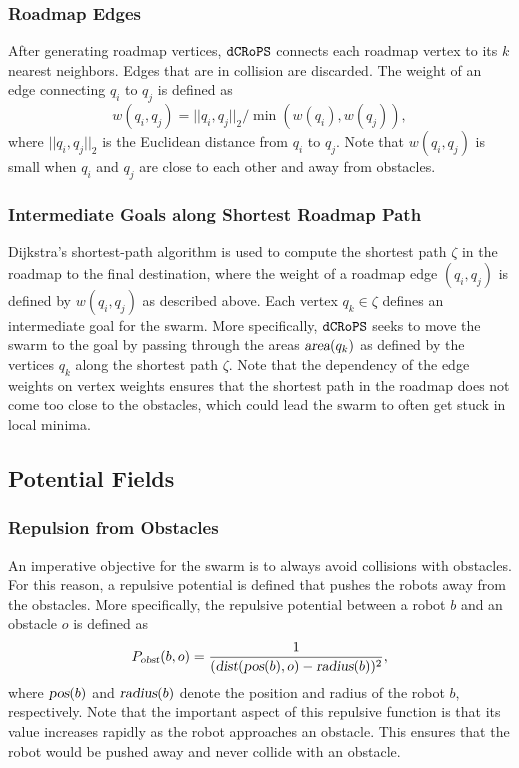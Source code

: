 \documentclass[letterpaper, 10pt, conference]{ieeeconf}
\newcommand{\Acronym}[1]{\ensuremath{{\small{\texttt{#1}}}}}
\newcommand{\Var}[1]{\ensuremath{{\small{\textsl{#1}}}}}
\newcommand{\Name}{\Acronym{dCRoPS}}
\begin{document}
\subsubsection{Roadmap Edges}
After generating roadmap vertices, $\Name$ connects each
roadmap vertex to its $k$ nearest neighbors. Edges that are in
collision are discarded. The weight of an edge connecting $q_i$ to
$q_j$ is defined as
$$
w(q_i, q_j) = ||q_i, q_j||_2 / \min(w(q_i), w(q_j)),
$$
where $||q_i, q_j||_2$ is the Euclidean distance from $q_i$ to $q_j$. Note
that $w(q_i, q_j)$ is small when $q_i$ and $q_j$ are close to each
other and away from obstacles.


\subsubsection{Intermediate Goals along Shortest Roadmap Path}

Dijkstra's shortest-path algorithm is used to compute the shortest path $\zeta$
in the roadmap to the final destination, where the weight of a roadmap edge
$(q_i, q_j)$ is defined by $w(q_i, q_j)$ as described above. Each vertex $q_k
\in \zeta$ defines an intermediate goal for the swarm. More specifically,
$\Name$ seeks to move the swarm to the goal by passing through the areas
$\Var{area}(q_k)$ as defined by the vertices $q_k$ along the shortest path
$\zeta$. Note that the dependency of the edge weights on vertex weights ensures
that the shortest path in the roadmap does not come too close to the obstacles,
which could lead the swarm to often get stuck in local minima.

\subsection{Potential Fields}
\label{sec:PF}

\subsubsection{Repulsion from Obstacles}
\label{sec:PFobst} An imperative objective for
the swarm is to always avoid collisions with obstacles. For this
reason, a repulsive potential is defined that pushes the robots away
from the obstacles. More specifically, the repulsive potential between
a robot $b$ and an obstacle $o$ is defined as
$$ P_\Var{obst}(b, o) = \frac{1}{(\Var{dist}(\Var{pos}(b), o) - \Var{radius}(b))^2},
$$ where $\Var{pos}(b)$ and
$\Var{radius}(b)$ denote the position and radius of the robot $b$, respectively. Note that the
important aspect of this repulsive function is that its value
increases rapidly as the robot approaches an obstacle. This ensures
that the robot would be pushed away and never collide with an obstacle.
\end{document}

